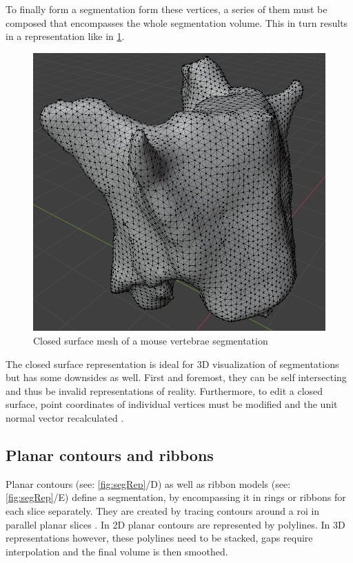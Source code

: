 \noindent
To finally form a segmentation form these vertices, a series of them must be composed that encompasses the whole segmentation volume.
This in turn results in a representation like in \cref{fig:spineMesh}.
\begin{figure}[h]
	\centerline{
		\includegraphics[scale=0.4]{images/spineMesh.png}}
	\caption{Closed surface mesh of a mouse vertebrae segmentation}\label{fig:spineMesh}
\end{figure}

\noindent
The closed surface representation is ideal for 3D visualization of segmentations but has some downsides as well.
First and foremost, they can be self intersecting and thus be invalid representations of reality.
Furthermore, to edit a closed surface, point coordinates of individual vertices must be modified
and the unit normal vector recalculated \cite{pinterPolymorphSegmentationRepresentation2019}.


\subsection{Planar contours and ribbons}\label{s:b-planar-contours}
Planar contours (see: \cref{fig:segRep}/D) as well as ribbon models (see: \cref{fig:segRep}/E) define a segmentation,
by encompassing it in rings or ribbons for each slice separately.
They are created by tracing contours around a \acrfull{roi} in parallel planar slices \cite{pinterPolymorphSegmentationRepresentation2019,weinsteinScanlineSurfacingBuilding2000}.
In 2D planar contours are represented by polylines.
In 3D representations however, these polylines need to be stacked, gaps require interpolation and the final volume is then smoothed.

